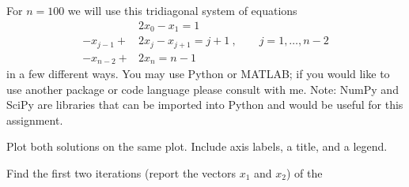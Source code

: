 \documentclass[12pt, answers]{exam}
\newcommand{\ve}[1]{\ensuremath{\mathbf{#1}}}
\begin{document}
\begin{questions}

\addpoints
\question[10]
For $n=100$ we will use this tridiagonal system of equations 
%
\begin{align}
&2x_0 - x_1 = 1 \nonumber \\
%
-x_{j-1} + &2x_j - x_{j+1} = j+1\:, \qquad j = 1, \dots, n-2 \nonumber \\
%
-x_{n-2} + &2x_n = n-1 \nonumber
\end{align}
%
in a few different ways. You may use Python or MATLAB; if you would like to use another package or code language please consult with me. Note: NumPy and SciPy are libraries that can be imported into Python and would be useful for this assignment.  
%

\noaddpoints
{}

Plot both solutions on the same plot. Include axis labels, a title, and a legend. 

\vspace*{3em}
\addpoints
\question[10]
\label{Q:iter}
Find the first two iterations (report the vectors $x_1$ and $x_2$) of the
%
\begin{parts}

\end{parts}
\end{questions}
\end{document}
